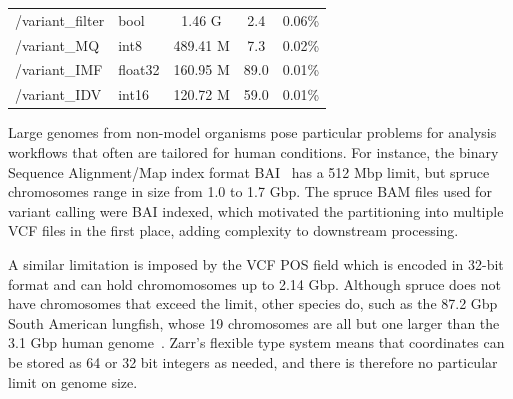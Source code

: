 \documentclass[a4paper,num-refs]{oup-contemporary}
\begin{document}
\begin{table}
\begin{tabular}{llS[table-format=3.2]S[table-format=3.2]S[table-format=3.2]}
/variant\_filter & bool & 1.46 G & 2.4 & 0.06\% \\
/variant\_MQ & int8 & 489.41 M & 7.3 & 0.02\% \\
/variant\_IMF & float32 & 160.95 M & 89.0 & 0.01\% \\
/variant\_IDV & int16 & 120.72 M & 59.0 & 0.01\% \\
\bottomrule
\end{tabular}
\end{table}

Large genomes from non-model organisms pose particular problems for
analysis workflows that often are tailored for human conditions. For
instance, the binary Sequence Alignment/Map index format
BAI~\cite{li2009sequence} has a 512
Mbp limit, but spruce chromosomes range in size from 1.0 to 1.7 Gbp.
The spruce BAM files used for variant calling were BAI indexed, which
motivated the partitioning into multiple VCF files in the first place,
adding complexity to downstream processing.

A similar limitation is imposed by the VCF POS field which is encoded
in 32-bit format and can hold chromomosomes up to 2.14 Gbp. Although
spruce does not have chromosomes that exceed the limit, other species
do, such as the 87.2 Gbp South American lungfish, whose 19 chromosomes
are all but one larger than the 3.1 Gbp human
genome~\cite{schartl_GenomesAllLungfish_2024}. Zarr's flexible type
system means that coordinates can be stored as 64 or 32 bit integers
as needed, and there is therefore no particular limit on genome size.
\end{document}

